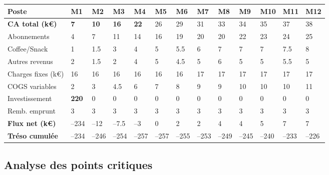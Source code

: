 \documentclass[11pt, a4paper]{article}
\newcommand{\redcell}[1]{\textcolor{fc-red}{\textbf{#1}}}
\newcommand{\negnum}[1]{\textcolor{fc-red}{#1}}
\newcommand{\posnum}[1]{\textcolor{green!60!black}{#1}}
\begin{document}
\vspace{8pt}
\begin{center}
\small
\begin{tabular}{@{}p{2.8cm}p{0.6cm}p{0.6cm}p{0.6cm}p{0.6cm}p{0.6cm}p{0.6cm}p{0.6cm}p{0.6cm}p{0.6cm}p{0.6cm}p{0.6cm}p{0.6cm}@{}}
\toprule
\rowcolor{fc-ink}\color{white}\textbf{Poste} & \color{white}\textbf{M1} & \color{white}\textbf{M2} & \color{white}\textbf{M3} & \color{white}\textbf{M4} & \color{white}\textbf{M5} & \color{white}\textbf{M6} & \color{white}\textbf{M7} & \color{white}\textbf{M8} & \color{white}\textbf{M9} & \color{white}\textbf{M10} & \color{white}\textbf{M11} & \color{white}\textbf{M12} \\
\midrule
\textbf{CA total (k€)} & \redcell{7} & \redcell{10} & \redcell{16} & \redcell{22} & \posnum{26} & \posnum{29} & \posnum{31} & \posnum{33} & \posnum{34} & \posnum{35} & \posnum{37} & \posnum{38} \\
\rowcolor{fc-bg2} Abonnements & 4 & 7 & 11 & 14 & 16 & 19 & 20 & 20 & 22 & 23 & 24 & 25 \\
Coffee/Snack & 1 & 1.5 & 3 & 4 & 5 & 5.5 & 6 & 7 & 7 & 7 & 7.5 & 8 \\
\rowcolor{fc-bg2} Autres revenus & 2 & 1.5 & 2 & 4 & 5 & 4.5 & 5 & 6 & 5 & 5 & 5.5 & 5 \\
Charges fixes (k€) & 16 & 16 & 16 & 16 & 16 & 16 & 17 & 17 & 17 & 17 & 17 & 17 \\
\rowcolor{fc-bg2} COGS variables & 2 & 3 & 4.5 & 6 & 7 & 8 & 9 & 9 & 10 & 10 & 10 & 11 \\
Investissement & \redcell{220} & 0 & 0 & 0 & 0 & 0 & 0 & 0 & 0 & 0 & 0 & 0 \\
\rowcolor{fc-bg2} Remb. emprunt & 3 & 3 & 3 & 3 & 3 & 3 & 3 & 3 & 3 & 3 & 3 & 3 \\
\midrule
\textbf{Flux net (k€)} & \negnum{–234} & \negnum{–12} & \negnum{–7.5} & \negnum{–3} & \posnum{0} & \posnum{2} & \posnum{2} & \posnum{4} & \posnum{4} & \posnum{5} & \posnum{7} & \posnum{7} \\
\rowcolor{fc-bg2}\textbf{Tréso cumulée} & \negnum{–234} & \negnum{–246} & \negnum{–254} & \negnum{–257} & \negnum{–257} & \negnum{–255} & \negnum{–253} & \negnum{–249} & \negnum{–245} & \negnum{–240} & \negnum{–233} & \negnum{–226} \\
\bottomrule
\end{tabular}
\end{center}

\subsection{Analyse des points critiques}
\end{document}
